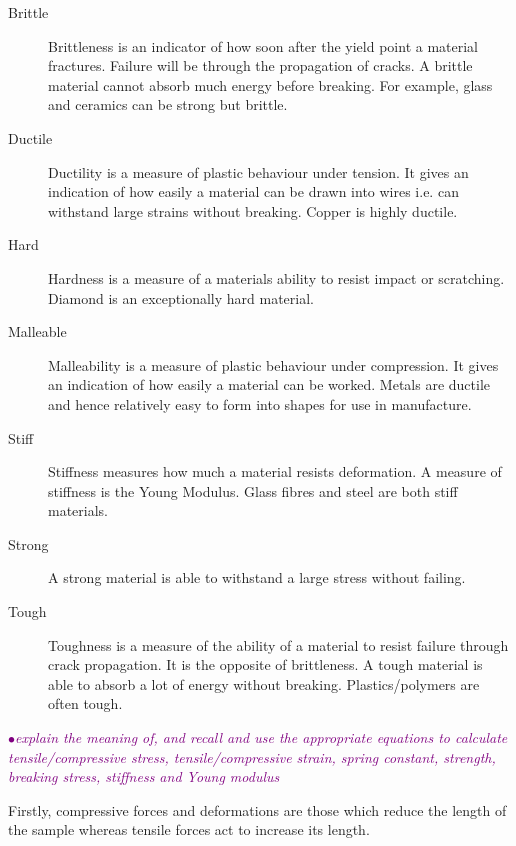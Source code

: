 \documentclass[a4paper,11pt,twoside]{memoir}
\newcounter{spec}[chapter]
\newcommand{\spec}[1]{\Needspace{5\baselineskip}\textcolor{purple}{$\bullet$\hspace{0.5cm}\textit{#1}}}
\begin{document}
\begin{description}
    \item[Brittle] Brittleness is an indicator of how soon after the yield point a material fractures. Failure will be through the propagation of cracks. A brittle material cannot absorb much energy before breaking. For example, glass and ceramics can be strong but brittle.
    \item[Ductile] Ductility is a measure of plastic behaviour under tension. It gives an indication of how easily a material can be drawn into wires i.e. can withstand large strains without breaking. Copper is highly ductile.
    \item[Hard] Hardness is a measure of a materials ability to resist impact or scratching. Diamond is an exceptionally hard material.
    \item[Malleable] Malleability is a measure of plastic behaviour under compression. It gives an indication of how easily a material can be worked. Metals are ductile and hence relatively easy to form into shapes for use in manufacture.
    \item[Stiff] Stiffness measures how much a material resists deformation. A measure of stiffness is the Young Modulus. Glass fibres and steel are both stiff materials.
    \item[Strong] A strong material is able to withstand a large stress without failing.
    \item[Tough] Toughness is a measure of the ability of a material to resist failure through crack propagation. It is the opposite of brittleness. A tough material is able to absorb a lot of energy without breaking. Plastics/polymers are often tough.
\end{description}

\spec{explain the meaning of,  and recall and use the appropriate equations to calculate tensile/compressive stress, tensile/compressive strain, spring constant, strength, breaking stress, stiffness and Young modulus}

Firstly, compressive forces and deformations are those which reduce the length of the sample whereas tensile forces act to increase its length.
\end{document}
